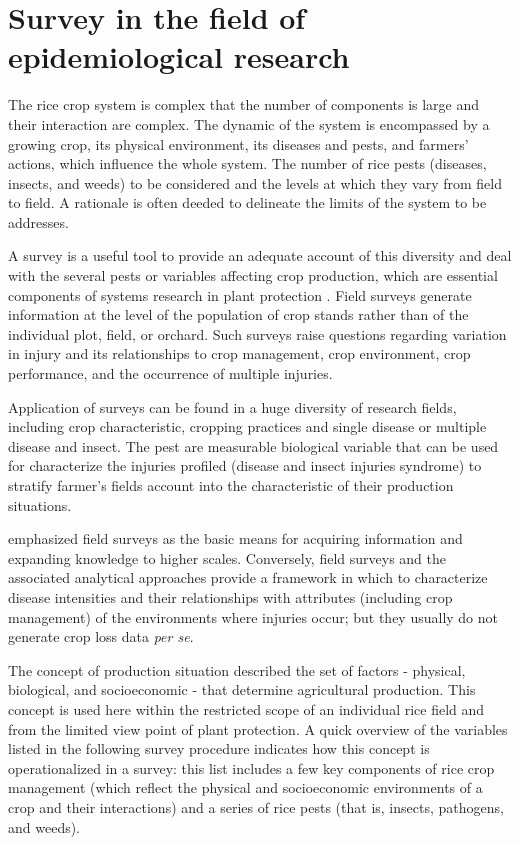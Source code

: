 \documentclass[12pt, oneside]{report}
\begin{document}
\section*{Survey in the field of epidemiological research}

The rice crop system is complex that the number of components is large and their interaction are complex. The dynamic of the system is encompassed by a growing crop, its physical environment, its diseases and pests, and farmers' actions, which influence the whole system. The number of rice pests (diseases, insects, and weeds) to be considered and the levels at which they vary from field to field. A rationale is often deeded to delineate the limits of the system to be addresses.

A survey is a useful tool to provide an adequate account of this diversity and deal with the several pests or variables affecting crop production, which are essential components of systems research in plant protection \citet{Zadoks:1979ts}. Field surveys generate information at the level of the population of crop stands rather than of the individual plot, field, or orchard. Such surveys raise questions regarding variation in injury and its relationships to crop management, crop environment, crop performance, and the occurrence of multiple injuries.

Application of surveys can be found in a huge diversity of research fields, including crop characteristic, cropping practices and single disease or multiple disease and insect. The pest are measurable biological variable that can be used for characterize the injuries profiled (disease and insect injuries syndrome) to stratify farmer's fields account into the characteristic of their production situations.

\cite{savary1995use} emphasized field surveys as the basic means for acquiring information and expanding knowledge to higher scales. Conversely, field surveys and the associated analytical approaches provide a framework in which to characterize disease intensities and their relationships with attributes (including crop management) of the environments where injuries occur; but they usually do not generate crop loss data \textit{per se}.

The concept of production situation described the set of factors - physical, biological, and socioeconomic - that determine agricultural production. This concept is used here within the restricted scope of an individual rice field and from the limited view point of plant protection. A quick overview of the variables listed in the following survey procedure indicates how this concept is operationalized in a survey: this list includes a few key components of rice crop management (which reflect the physical and socioeconomic environments of a crop and their interactions) and a series of rice pests (that is, insects, pathogens, and weeds).
\end{document}
